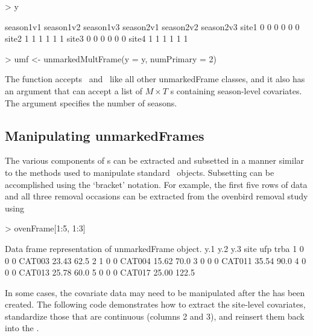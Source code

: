\documentclass[article,shortnames]{jss}
\newcommand{\rlang}{\proglang{R}}
\newcommand{\scovs}{\code{siteCovs}}
\newcommand{\ocovs}{\code{obsCovs}}
\begin{document}
{\newpage

\begin{Schunk}
\begin{Sinput}
> y
\end{Sinput}
\begin{Soutput}
      season1v1 season1v2 season1v3 season2v1 season2v2 season2v3
site1         0         0         0         0         0         0
site2         1         1         1         1         1         1
site3         0         0         0         0         0         0
site4         1         1         1         1         1         1
\end{Soutput}
\begin{Sinput}
> umf <- unmarkedMultFrame(y = y, numPrimary = 2)
\end{Sinput}
\end{Schunk}

The function  accepts \scovs\ and \ocovs\ like all
other unmarkedFrame classes, and it also has an argument 
that can accept a list of $M \times T$ s containing
season-level covariates. The  argument specifies the
number of seasons.

\subsection{Manipulating unmarkedFrames}
\label{sec:manip}

The various components of s can be extracted and
subsetted in a manner similar to the methods used to manipulate standard
\rlang\ objects.  Subsetting can be accomplished using the `bracket'
notation. For example, the first five rows of data and all three
removal occasions can be extracted from the ovenbird removal study using

\begin{Schunk}
\begin{Sinput}
> ovenFrame[1:5, 1:3]
\end{Sinput}
\begin{Soutput}
Data frame representation of unmarkedFrame object.
  y.1 y.2 y.3   site   ufp  trba
1   0   0   0 CAT003 23.43  62.5
2   1   0   0 CAT004 15.62  70.0
3   0   0   0 CAT011 35.54  90.0
4   0   0   0 CAT013 25.78  60.0
5   0   0   0 CAT017 25.00 122.5
\end{Soutput}
\end{Schunk}

In some cases, the covariate data may need to be manipulated after the
 has been created. The following code demonstrates
how to extract the site-level covariates, standardize those that are
continuous (columns 2 and 3), and reinsert them back into the
.

}
\end{document}
